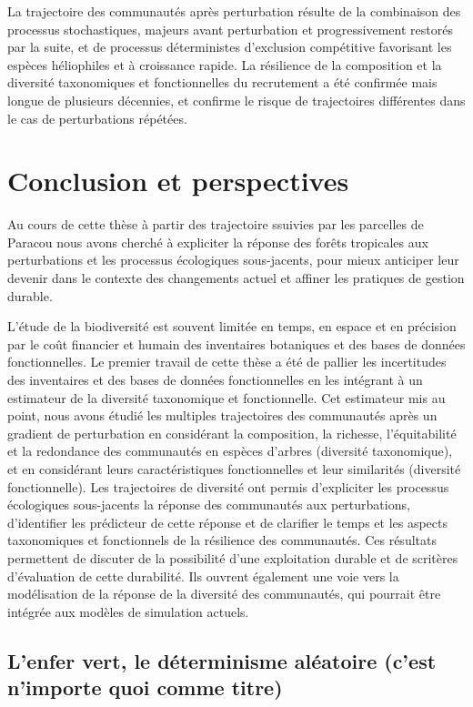 \documentclass[
  11pt,
  french,
  A4paper,
  extrafontsizes,onecolumn,openright
  ]{memoir}
\begin{document}
La trajectoire des communautés après perturbation résulte de la
combinaison des processus stochastiques, majeurs avant perturbation et
progressivement restorés par la suite, et de processus déterministes
d'exclusion compétitive favorisant les espèces héliophiles et à
croissance rapide. La résilience de la composition et la diversité
taxonomiques et fonctionnelles du recrutement a été confirmée mais
longue de plusieurs décennies, et confirme le risque de trajectoires
différentes dans le cas de perturbations répétées.

\chapter{Conclusion et perspectives}\label{conclusion-et-perspectives}

Au cours de cette thèse à partir des trajectoire ssuivies par les
parcelles de Paracou nous avons cherché à expliciter la réponse des
forêts tropicales aux perturbations et les processus écologiques
sous-jacents, pour mieux anticiper leur devenir dans le contexte des
changements actuel et affiner les pratiques de gestion durable.

L'étude de la biodiversité est souvent limitée en temps, en espace et en
précision par le coût financier et humain des inventaires botaniques et
des bases de données fonctionnelles. Le premier travail de cette thèse a
été de pallier les incertitudes des inventaires et des bases de données
fonctionnelles en les intégrant à un estimateur de la diversité
taxonomique et fonctionnelle. Cet estimateur mis au point, nous avons
étudié les multiples trajectoires des communautés après un gradient de
perturbation en considérant la composition, la richesse, l'équitabilité
et la redondance des communautés en espèces d'arbres (diversité
taxonomique), et en considérant leurs caractéristiques fonctionnelles et
leur similarités (diversité fonctionnelle). Les trajectoires de
diversité ont permis d'expliciter les processus écologiques sous-jacents
la réponse des communautés aux perturbations, d'identifier les
prédicteur de cette réponse et de clarifier le temps et les aspects
taxonomiques et fonctionnels de la résilience des communautés. Ces
résultats permettent de discuter de la possibilité d'une exploitation
durable et de scritères d'évaluation de cette durabilité. Ils ouvrent
également une voie vers la modélisation de la réponse de la diversité
des communautés, qui pourrait être intégrée aux modèles de simulation
actuels.

\section{L'enfer vert, le déterminisme aléatoire (c'est n'importe quoi
comme
titre)}\label{lenfer-vert-le-determinisme-aleatoire-cest-nimporte-quoi-comme-titre}
\end{document}

